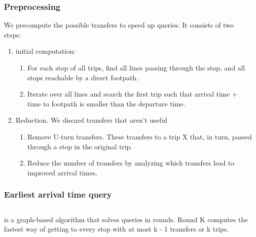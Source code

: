 \subsubsection{Preprocessing}
We precompute the possible transfers to speed up queries. It consists of two steps:
\begin{enumerate}
    \item initial computation: \begin{enumerate}
        \item For each stop of all trips, find all lines passing through the stop, and all stops reachable by a direct footpath.
        \item Iterate over all lines and search the first trip such that arrival time + time to footpath is smaller than the departure time.
    \end{enumerate}
    \item Reduction. We discard transfers that aren’t useful \begin{enumerate}
        \item Remove U-turn transfers. These transfers to a trip X that, in turn, passed through a stop in the original trip.
        \item Reduce the number of transfers by analyzing which transfers lead to improved arrival times.
    \end{enumerate}
    
\end{enumerate}
\subsubsection{Earliest arrival time query}

\subsection{}
 is a graph-based algorithm that solves queries in rounds. Round K computes the fastest way of getting to every stop with at most k - 1 transfers or k trips.

